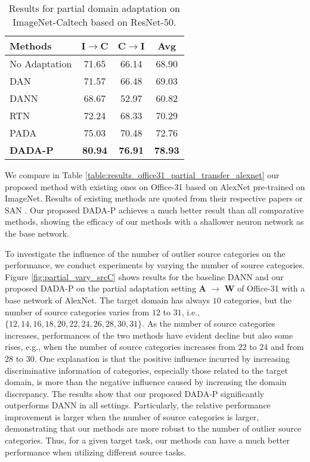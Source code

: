 \documentclass[letterpaper]{article} \usepackage{aaai20}  \usepackage{times}  \usepackage{helvet} \usepackage{courier}  \usepackage[hyphens]{url}  \usepackage{graphicx} \urlstyle{rm} \def\UrlFont{\rm}  \usepackage{graphicx}  \frenchspacing  \setlength{\pdfpagewidth}{8.5in}  \setlength{\pdfpageheight}{11in}
\begin{document}
\begin{table}[t]
	\begin{center}
		\caption{Results for partial domain adaptation on ImageNet-Caltech based on ResNet-50.}
		\label{table:results_imagenet_caltech_partial_transfer}
		\begin{tabular}{lccc}
			\hline
			Methods  & I$\rightarrow$C & C$\rightarrow$I & Avg  \\
			\hline
			No Adaptation \cite{resnet} & 71.65 & 66.14 & 68.90 \\
			
			DAN \cite{dan}              & 71.57 & 66.48 & 69.03  \\
			
			DANN \cite{dann}            & 68.67 & 52.97 & 60.82  \\
			
			RTN \cite{rtn}              & 72.24 & 68.33 & 70.29  \\  
			
			PADA \cite{pada}            & 75.03 & 70.48 & 72.76  \\
			\hline
			\textbf{DADA-P}           & \textbf{80.94} & \textbf{76.91} & \textbf{78.93} \\
			\hline
		\end{tabular}
	\end{center}
\end{table}

We compare in Table \ref{table:results_office31_partial_transfer_alexnet} our proposed method with existing ones on Office-31 based on AlexNet \cite{alexnet} pre-trained on ImageNet. Results of existing methods are quoted from their respective papers or SAN \cite{san}. Our proposed DADA-P achieves a much better result than all comparative methods, showing the efficacy of our methods with a shallower neuron network as the base network.

To investigate the influence of the number of outlier source categories on the performance, we conduct experiments by varying the number of source categories. Figure \ref{fig:partial_vary_srcC} shows results for the baseline DANN \cite{dann} and our proposed DADA-P on the partial adaptation setting \textbf{A} $\rightarrow$ \textbf{W} of Office-31 with a base network of AlexNet. The target domain has always $10$ categories, but the number of source categories varies from $12$ to $31$, i.e., $\{12, 14, 16, 18, 20, 22, 24, 26, 28, 30, 31\}$. As the number of source categories increases, performances of the two methods have evident decline but also some rises, e.g., when the number of source categories increases from $22$ to $24$ and from $28$ to $30$. One explanation is that the positive influence incurred by increasing discriminative information of categories, especially those related to the target domain, is more than the negative influence caused by increasing the domain discrepancy. The results show that our proposed DADA-P significantly outperforms DANN in all settings. Particularly, the relative performance improvement is larger when the number of source categories is larger, demonstrating that our methods are more robust to the number of outlier source categories. Thus, for a given target task, our methods can have a much better performance when utilizing different source tasks.
\end{document}

